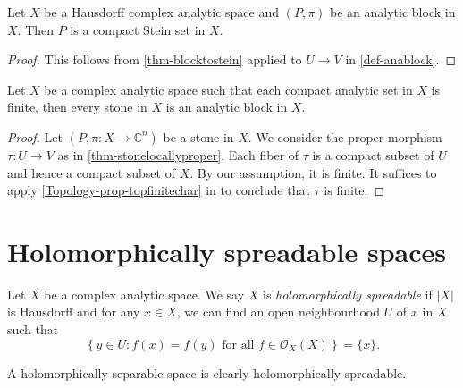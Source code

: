 \begin{proposition}
    Let $X$ be a Hausdorff complex analytic space and $(P,\pi)$ be an analytic block in $X$. Then $P$ is a compact Stein set in $X$.
\end{proposition}
\begin{proof}
    This follows from \cref{thm-blocktostein} applied to $U\rightarrow V$ in \cref{def-anablock}.
\end{proof}

\begin{proposition}\label{prop-stoneisblockunderass}
    Let $X$ be a complex analytic space such that each compact analytic set in $X$ is finite, then every stone in $X$ is an analytic block in $X$.
\end{proposition}
\begin{proof}
    Let $(P,\pi:X\rightarrow \mathbb{C}^n)$ be a stone in $X$.
    We consider the proper morphism $\tau:U\rightarrow V$ as in \cref{thm-stonelocallyproper}. Each fiber of $\tau$ is a compact subset of $U$ and hence a compact subset of $X$. By our assumption, it is finite. It suffices to apply \cref{Topology-prop-topfinitechar} in  to conclude that $\tau$ is finite.
\end{proof}

\section{Holomorphically spreadable spaces}
\begin{definition}
    Let $X$ be a complex analytic space. We say $X$ is \emph{holomorphically spreadable} if $|X|$ is Hausdorff and for any $x\in X$, we can find an open neighbourhood $U$ of $x$ in $X$ such that
    \[
        \left\{y\in U:f(x)=f(y)\text{ for all }f\in \mathcal{O}_X(X) \right\} =\{x\}.
    \]
\end{definition}
A holomorphically separable space is clearly holomorphically spreadable.



